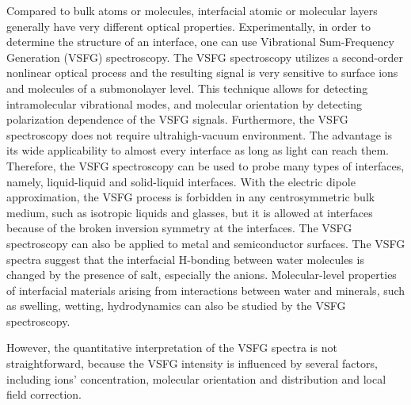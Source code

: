 Compared to bulk atoms or molecules,
interfacial atomic or molecular layers generally have very different optical properties. 
Experimentally, in order to determine the structure of an interface, one can use Vibrational Sum-Frequency Generation (VSFG) spectroscopy.
The VSFG spectroscopy utilizes a second-order nonlinear optical process and the resulting signal is very sensitive to surface ions and 
molecules of a submonolayer level. \cite{Morita2008,WangHongFei2015,WenYuChieh2016,Ishiyama2017,Penalber-Johnstone2018} 
This technique allows for detecting intramolecular vibrational modes, and molecular orientation by detecting polarization dependence of the VSFG signals. \cite{Vidal05}  
Furthermore, the VSFG spectroscopy does not require ultrahigh-vacuum environment. \cite{WeiX02}
The advantage is its wide applicability to almost every interface as long as light can reach them. 
Therefore, the VSFG spectroscopy can be used to probe many types of interfaces, namely, liquid-liquid and 
solid-liquid interfaces. \cite{Guyot-Sionnest1987,RS91,Du93,QD94,Richmond02,Gopalakrishnan2006,ShenYR2006,Morita2008}
With the electric dipole approximation, the VSFG process is forbidden in any centrosymmetric bulk medium, \cite{Che12}
such as isotropic liquids and glasses,  but it is allowed at interfaces because of the broken inversion symmetry at the interfaces. \cite{PF00}
The VSFG spectroscopy can also be applied to metal and semiconductor surfaces. \cite{Harris87,Superfine88}
The VSFG spectra suggest that the interfacial H-bonding between water molecules is changed by the presence of salt, 
especially the anions. \cite{EAR04}
Molecular-level properties of interfacial materials arising from interactions between water and minerals, 
such as swelling, wetting, hydrodynamics can also be studied by the VSFG spectroscopy. \cite{Rotenberg14}

However, the quantitative interpretation of the VSFG spectra is not straightforward,
because the VSFG intensity is influenced by several factors, including ions' concentration, 
molecular orientation and distribution and local field correction. \cite{Morita2008}


